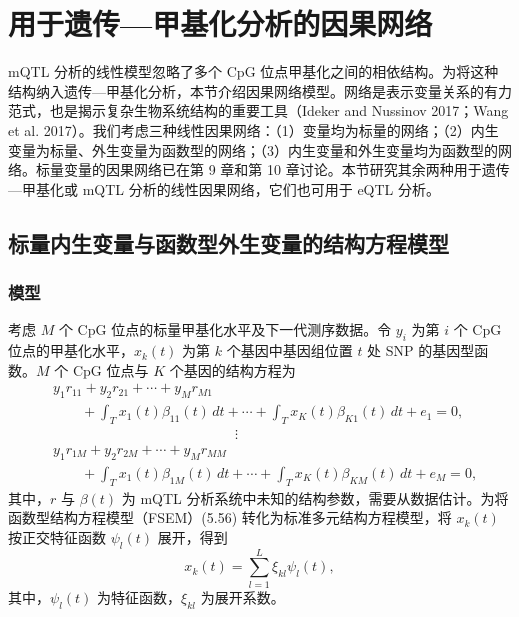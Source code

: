 \FloatBarrier
\section{用于遗传—甲基化分析的因果网络}

mQTL 分析的线性模型忽略了多个 CpG 位点甲基化之间的相依结构。为将这种结构纳入遗传—甲基化分析，本节介绍因果网络模型。网络是表示变量关系的有力范式，也是揭示复杂生物系统结构的重要工具（Ideker and Nussinov 2017；Wang et al. 2017）。我们考虑三种线性因果网络：（1）变量均为标量的网络；（2）内生变量为标量、外生变量为函数型的网络；（3）内生变量和外生变量均为函数型的网络。标量变量的因果网络已在第 9 章和第 10 章讨论。本节研究其余两种用于遗传—甲基化或 mQTL 分析的线性因果网络，它们也可用于 eQTL 分析。

\subsection{标量内生变量与函数型外生变量的结构方程模型}
\subsubsection{模型}

考虑 $M$ 个 CpG 位点的标量甲基化水平及下一代测序数据。令 $y_i$ 为第 $i$ 个 CpG 位点的甲基化水平，$x_k(t)$ 为第 $k$ 个基因中基因组位置 $t$ 处 SNP 的基因型函数。$M$ 个 CpG 位点与 $K$ 个基因的结构方程为
\begin{equation}
\begin{aligned}
&y_1r_{11}+y_2r_{21}+\cdots+y_Mr_{M1}\\
&\qquad+\int_Tx_1(t)\beta_{11}(t)\,dt+\cdots
+\int_Tx_K(t)\beta_{K1}(t)\,dt+e_1=0,\\
&\hspace{13em}\vdots\\
&y_1r_{1M}+y_2r_{2M}+\cdots+y_Mr_{MM}\\
&\qquad+\int_Tx_1(t)\beta_{1M}(t)\,dt+\cdots
+\int_Tx_K(t)\beta_{KM}(t)\,dt+e_M=0,
\end{aligned}
\tag{5.56}
\end{equation}
其中，$r$ 与 $\beta(t)$ 为 mQTL 分析系统中未知的结构参数，需要从数据估计。为将函数型结构方程模型（FSEM）(5.56) 转化为标准多元结构方程模型，将 $x_k(t)$ 按正交特征函数 $\psi_l(t)$ 展开，得到
\begin{equation}
x_k(t)=\sum_{l=1}^L\xi_{kl}\psi_l(t),
\tag{5.57}
\end{equation}
其中，$\psi_l(t)$ 为特征函数，$\xi_{kl}$ 为展开系数。

